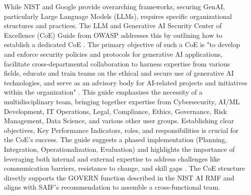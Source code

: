 While NIST and Google provide overarching frameworks, securing GenAI, particularly Large Language Models (LLMs), requires specific organizational structures and practices. The LLM and Generative AI Security Center of Excellence (CoE) Guide from OWASP addresses this by outlining how to establish a dedicated CoE \cite{OWASP:2024:LLMCOEGuide}. The primary objective of such a CoE is "to develop and enforce security policies and protocols for generative AI applications, facilitate cross-departmental collaboration to harness expertise from various fields, educate and train teams on the ethical and secure use of generative AI technologies, and serve as an advisory body for AI-related projects and initiatives within the organization" \cite[p.4]{OWASP:2024:LLMCOEGuide}. This guide emphasizes the necessity of a multidisciplinary team, bringing together expertise from Cybersecurity, AI/ML Development, IT Operations, Legal, Compliance, Ethics, Governance, Risk Management, Data Science, and various other user groups\cite{OWASP:2024:LLMCOEGuide}. Establishing clear objectives, Key Performance Indicators, roles, and responsibilities is crucial for the CoE's success. The guide suggests a phased implementation (Planning, Integration, Operationalization, Evaluation) and highlights the importance of leveraging both internal and external expertise to address challenges like communication barriers, resistance to change, and skill gaps \cite{OWASP:2024:LLMCOEGuide}. The CoE structure directly supports the GOVERN function described in the NIST AI RMF and aligns with SAIF's recommendation to assemble a cross-functional team.

